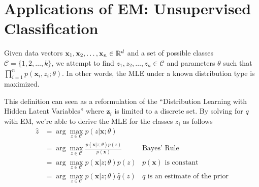\section{Applications of EM: Unsupervised Classification}
\begin{definition}
    Given data vectors $\mathbf{x}_1,\mathbf{x}_2,\dots,\mathbf{x}_n\in\mathbb{R}^d$ and a set of possible classes $\mathcal{C}=\{1,2,\dots,k\}$, we attempt to find $z_1,z_2,\dots,z_n\in \mathcal{C}$ and parameters $\theta$ such that $\prod_{i=1}^n p(\mathbf{x}_i,z_i;\theta)$. In other words, the MLE under a known distribution type is maximized.
\end{definition}
This definition can seen as a reformulation of the ``Distribution Learning with Hidden Latent Variables'' where $\mathbf{z}_i$ is limited to a discrete set. By solving for $q$ with EM, we're able to derive the MLE for the classes $z_i$ as follows
\begin{align*}
    \hat{z} 
    &= \arg\max_{z\in\mathcal{C}} p(z|\mathbf{x};\theta) \\
    &= \arg\max_{z\in\mathcal{C}} \frac{p(\mathbf{x}|z;\theta)p(z)}{p(\mathbf{x})} & \text{Bayes' Rule}\\
    &= \arg\max_{z\in\mathcal{C}} p(\mathbf{x}|z;\theta)p(z) & p(\mathbf{x})\text{ is constant} \\
    &= \arg\max_{z\in\mathcal{C}} p(\mathbf{x}|z;\theta)\hat{q}(z) & \hat{q}\text{ is an estimate of the prior}
\end{align*}

